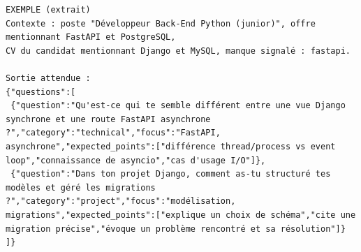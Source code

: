 \begin{lstlisting}[style=adamprompt]
EXEMPLE (extrait)
Contexte : poste "Développeur Back-End Python (junior)", offre mentionnant FastAPI et PostgreSQL,
CV du candidat mentionnant Django et MySQL, manque signalé : fastapi.

Sortie attendue :
{"questions":[
 {"question":"Qu'est-ce qui te semble différent entre une vue Django synchrone et une route FastAPI asynchrone ?","category":"technical","focus":"FastAPI, asynchrone","expected_points":["différence thread/process vs event loop","connaissance de asyncio","cas d'usage I/O"]},
 {"question":"Dans ton projet Django, comment as-tu structuré tes modèles et géré les migrations ?","category":"project","focus":"modélisation, migrations","expected_points":["explique un choix de schéma","cite une migration précise","évoque un problème rencontré et sa résolution"]}
]}
\end{lstlisting}
